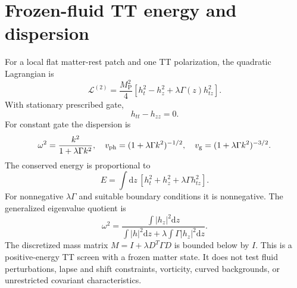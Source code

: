 \documentclass[11pt,oneside]{report}
\newcommand{\dd}{\mathrm d}
\newcommand{\MP}{M_{\mathrm P}}
\begin{document}
\section{Frozen-fluid TT energy and dispersion}
For a local flat matter-rest patch and one TT polarization, the quadratic Lagrangian is
\begin{equation}
\mathcal L^{(2)}=\frac{\MP^2}{4}\left[h_t^2-h_z^2+\lambda\Gamma(z)h_{tz}^2\right].
\end{equation}
With stationary prescribed gate,
\begin{equation}
[1-\lambda\partial_z(\Gamma\partial_z)]h_{tt}-h_{zz}=0.
\end{equation}
For constant gate the dispersion is
\begin{equation}
\omega^2=\frac{k^2}{1+\lambda\Gamma k^2},\quad
v_{\rm ph}=(1+\lambda\Gamma k^2)^{-1/2},\quad
v_{\rm g}=(1+\lambda\Gamma k^2)^{-3/2}.
\end{equation}
The conserved energy is proportional to
\begin{equation}
E=\int\dd z\,[h_t^2+h_z^2+\lambda\Gamma h_{tz}^2].
\end{equation}
For nonnegative $\lambda\Gamma$ and suitable boundary conditions it is nonnegative. The generalized eigenvalue quotient is
\begin{equation}
\omega^2=\frac{\int|h_z|^2\dd z}
{\int|h|^2\dd z+\lambda\int\Gamma|h_z|^2\dd z}.
\end{equation}
The discretized mass matrix $M=I+\lambda D^T\Gamma D$ is bounded below by $I$. This is a positive-energy TT screen with a frozen matter state. It does not test fluid perturbations, lapse and shift constraints, vorticity, curved backgrounds, or unrestricted covariant characteristics.
\end{document}
